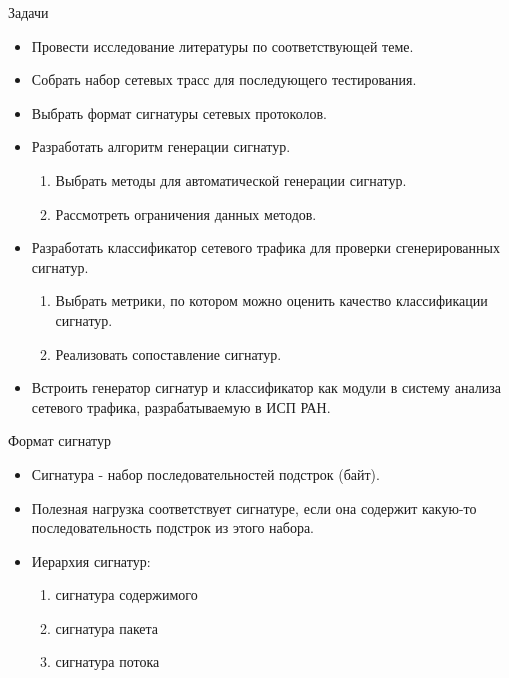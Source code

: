 \documentclass[10pt]{beamer}
\begin{document}
\begin{frame}{Задачи}
    \begin{itemize}
        \item Провести исследование литературы по соответствующей теме.
        \item Собрать набор сетевых трасс для последующего тестирования.
        \item Выбрать формат сигнатуры сетевых протоколов.
        \item Разработать алгоритм генерации сигнатур.
        \begin{enumerate}
            \item Выбрать методы для автоматической генерации сигнатур.
            \item Рассмотреть ограничения данных методов.
        \end{enumerate}
        \item Разработать классификатор сетевого трафика для проверки сгенерированных сигнатур.
        \begin{enumerate}
            \item Выбрать метрики, по котором можно оценить качество классификации сигнатур.
            \item Реализовать сопоставление сигнатур.
        \end{enumerate}
        \item Встроить генератор сигнатур и классификатор как модули в систему анализа сетевого трафика, разрабатываемую в ИСП РАН.
    \end{itemize}
\end{frame}

\begin{frame}{Формат сигнатур}
    \begin{itemize}
        \item Сигнатура - набор последовательностей подстрок (байт).
        \item Полезная нагрузка соответствует
        сигнатуре, если она содержит какую-то последовательность подстрок из этого набора.
        \item Иерархия сигнатур:
        \begin{enumerate}
            \item сигнатура содержимого
            \item сигнатура пакета
            \item сигнатура потока
        \end{enumerate}
    \end{itemize}
\end{frame}
\end{document}
